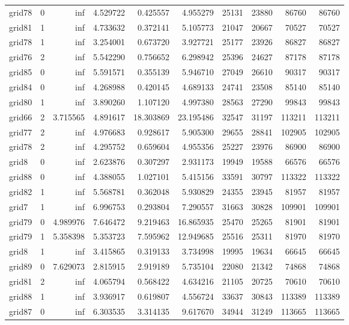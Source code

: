 \begin{longtable}{|l|r|r|r|r|r|r|r|r|r|}
grid78 & 0 & inf & 4.529722 & 0.425557 & 4.955279 & 25131 & 23880 & 86760 & 86760 \\
grid81 & 1 & inf & 4.733632 & 0.372141 & 5.105773 & 21047 & 20667 & 70527 & 70527 \\
grid78 & 1 & inf & 3.254001 & 0.673720 & 3.927721 & 25177 & 23926 & 86827 & 86827 \\
grid76 & 2 & inf & 5.542290 & 0.756652 & 6.298942 & 25396 & 24627 & 87178 & 87178 \\
grid85 & 0 & inf & 5.591571 & 0.355139 & 5.946710 & 27049 & 26610 & 90317 & 90317 \\
grid84 & 0 & inf & 4.268988 & 0.420145 & 4.689133 & 24741 & 23508 & 85140 & 85140 \\
grid80 & 1 & inf & 3.890260 & 1.107120 & 4.997380 & 28563 & 27290 & 99843 & 99843 \\
grid66 & 2 & 3.715565 & 4.891617 & 18.303869 & 23.195486 & 32547 & 31197 & 113211 & 113211 \\
grid77 & 2 & inf & 4.976683 & 0.928617 & 5.905300 & 29655 & 28841 & 102905 & 102905 \\
grid78 & 2 & inf & 4.295752 & 0.659604 & 4.955356 & 25227 & 23976 & 86900 & 86900 \\
grid8 & 0 & inf & 2.623876 & 0.307297 & 2.931173 & 19949 & 19588 & 66576 & 66576 \\
grid88 & 0 & inf & 4.388055 & 1.027101 & 5.415156 & 33591 & 30797 & 113322 & 113322 \\
grid82 & 1 & inf & 5.568781 & 0.362048 & 5.930829 & 24355 & 23945 & 81957 & 81957 \\
grid7 & 1 & inf & 6.996753 & 0.293804 & 7.290557 & 31663 & 30828 & 109901 & 109901 \\
grid79 & 0 & 4.989976 & 7.646472 & 9.219463 & 16.865935 & 25470 & 25265 & 81901 & 81901 \\
grid79 & 1 & 5.358398 & 5.353723 & 7.595962 & 12.949685 & 25516 & 25311 & 81970 & 81970 \\
grid8 & 1 & inf & 3.415865 & 0.319133 & 3.734998 & 19995 & 19634 & 66645 & 66645 \\
grid89 & 0 & 7.629073 & 2.815915 & 2.919189 & 5.735104 & 22080 & 21342 & 74868 & 74868 \\
grid81 & 2 & inf & 4.065794 & 0.568422 & 4.634216 & 21105 & 20725 & 70610 & 70610 \\
grid88 & 1 & inf & 3.936917 & 0.619807 & 4.556724 & 33637 & 30843 & 113389 & 113389 \\
grid87 & 0 & inf & 6.303535 & 3.314135 & 9.617670 & 34944 & 31249 & 113665 & 113665 \\

\end{longtable}
